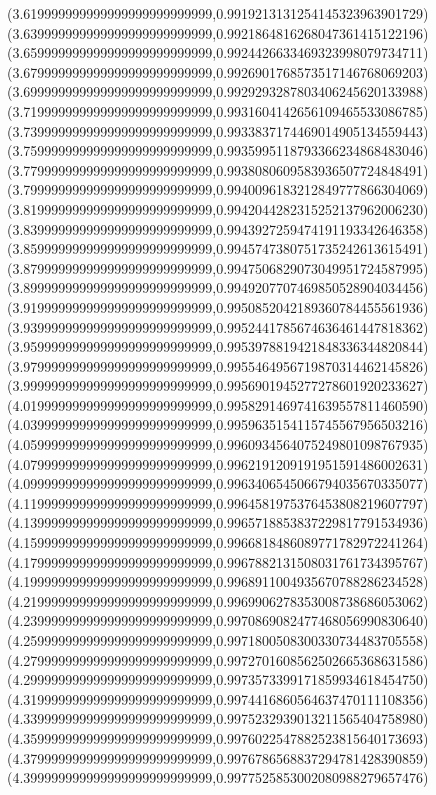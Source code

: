 \documentclass[11pt]{report}
\begin{document}
\begin{center}
  (3.619999999999999999999999999,0.9919213131254145323963901729)
  (3.639999999999999999999999999,0.9921864816268047361415122196)
  (3.659999999999999999999999999,0.9924426633469323998079734711)
  (3.679999999999999999999999999,0.9926901768573517146768069203)
  (3.699999999999999999999999999,0.9929293287803406245620133988)
  (3.719999999999999999999999999,0.9931604142656109465533086785)
  (3.739999999999999999999999999,0.9933837174469014905134559443)
  (3.759999999999999999999999999,0.9935995118793366234868483046)
  (3.779999999999999999999999999,0.9938080609583936507724848491)
  (3.799999999999999999999999999,0.9940096183212849777866304069)
  (3.819999999999999999999999999,0.9942044282315252137962006230)
  (3.839999999999999999999999999,0.9943927259474191193342646358)
  (3.859999999999999999999999999,0.9945747380751735242613615491)
  (3.879999999999999999999999999,0.9947506829073049951724587995)
  (3.899999999999999999999999999,0.9949207707469850528904034456)
  (3.919999999999999999999999999,0.9950852042189360784455561936)
  (3.939999999999999999999999999,0.9952441785674636461447818362)
  (3.959999999999999999999999999,0.9953978819421848336344820844)
  (3.979999999999999999999999999,0.9955464956719870314462145826)
  (3.999999999999999999999999999,0.9956901945277278601920233627)
  (4.019999999999999999999999999,0.9958291469741639557811460590)
  (4.039999999999999999999999999,0.9959635154115745567956503216)
  (4.059999999999999999999999999,0.9960934564075249801098767935)
  (4.079999999999999999999999999,0.9962191209191951591486002631)
  (4.099999999999999999999999999,0.9963406545066794035670335077)
  (4.119999999999999999999999999,0.9964581975376453808219607797)
  (4.139999999999999999999999999,0.9965718853837229817791534936)
  (4.159999999999999999999999999,0.9966818486089771782972241264)
  (4.179999999999999999999999999,0.9967882131508031761734395767)
  (4.199999999999999999999999999,0.9968911004935670788286234528)
  (4.219999999999999999999999999,0.9969906278353008738686053062)
  (4.239999999999999999999999999,0.9970869082477468056990830640)
  (4.259999999999999999999999999,0.9971800508300330734483705558)
  (4.279999999999999999999999999,0.9972701608562502665368631586)
  (4.299999999999999999999999999,0.9973573399171859934618454750)
  (4.319999999999999999999999999,0.9974416860564637470111108356)
  (4.339999999999999999999999999,0.9975232939013211565404758980)
  (4.359999999999999999999999999,0.9976022547882523815640173693)
  (4.379999999999999999999999999,0.9976786568837294781428390859)
  (4.399999999999999999999999999,0.9977525853002080988279657476)

\end{center}
\end{document}
